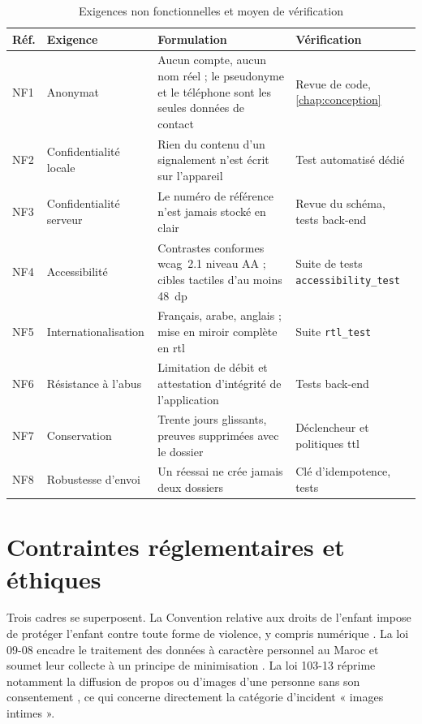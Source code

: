 \documentclass[11pt,a4paper,oneside,openany]{report}
\begin{document}
\begin{table}[htbp]
\centering
\small
\caption{Exigences non fonctionnelles et moyen de vérification}
\label{tab:nfr}
\begin{tabularx}{\textwidth}{@{}L{0.9cm} L{3.5cm} X L{3.0cm}@{}}
\toprule
\textbf{Réf.} & \textbf{Exigence} & \textbf{Formulation} & \textbf{Vérification} \\
\midrule
NF1 & Anonymat & Aucun compte, aucun nom réel ; le pseudonyme et le téléphone
sont les seules données de contact & Revue de code, \cref{chap:conception} \\
NF2 & Confidentialité locale & Rien du contenu d'un signalement n'est écrit sur
l'appareil & Test automatisé dédié \\
NF3 & Confidentialité serveur & Le numéro de référence n'est jamais stocké en
clair & Revue du schéma, tests back-end \\
NF4 & Accessibilité & Contrastes conformes \gls{wcag}~2.1 niveau AA
\cite{wcag} ; cibles tactiles d'au moins 48~dp & Suite de tests
\texttt{accessibility\_test} \\
NF5 & Internationalisation & Français, arabe, anglais ; mise en miroir complète
en \gls{rtl} & Suite \texttt{rtl\_test} \\
NF6 & Résistance à l'abus & Limitation de débit et attestation d'intégrité de
l'application & Tests back-end \\
NF7 & Conservation & Trente jours glissants, preuves supprimées avec le dossier
& Déclencheur et politiques \gls{ttl} \\
NF8 & Robustesse d'envoi & Un réessai ne crée jamais deux dossiers & Clé
d'idempotence, tests \\
\bottomrule
\end{tabularx}
\end{table}

\section{Contraintes réglementaires et éthiques}

Trois cadres se superposent. La Convention relative aux droits de l'enfant
impose de protéger l'enfant contre toute forme de violence, y compris
numérique \cite{cide}. La loi 09-08 encadre le traitement des données à
caractère personnel au Maroc et soumet leur collecte à un principe de
minimisation \cite{loi0908}. La loi 103-13 réprime notamment la diffusion de
propos ou d'images d'une personne sans son consentement \cite{loi10313}, ce qui
concerne directement la catégorie d'incident « images intimes ».
\end{document}
